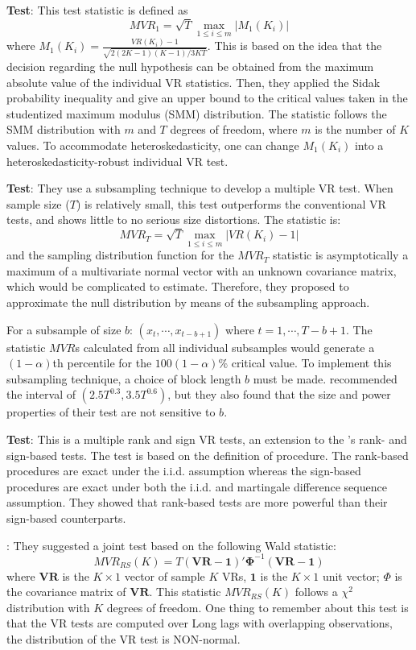 \textbf{\citet{chow1993simple} Test}: This test statistic is defined as 
$$MVR_1=\sqrt{T}\max_{1\leq i \leq m}|M_1(K_i)|$$
where $M_1(K_i) = \frac{VR(K_i)-1}{\sqrt{2(2K-1)(K-1)/3KT}}$. This is based on the idea that the decision regarding the null hypothesis can be obtained from the maximum absolute value of
the individual VR statistics. Then, they applied the Sidak probability inequality and give an upper bound to the critical values taken in the studentized maximum modulus (SMM) distribution.
The statistic follows the SMM distribution with $m$ and $T$ degrees of freedom, where $m$ is the number of $K$ values. To accommodate heteroskedasticity, one can change $M_1(K_i)$ into 
a heteroskedasticity-robust individual VR test.

\textbf{\cite{whang2003multiple} Test}: They use a subsampling technique to develop a multiple VR test. When sample size ($T$) is relatively small, this test outperforms the conventional VR
tests, and shows little to no serious size distortions. The statistic is:
$$
MVR_T = \sqrt{T}\max_{1\leq i \leq m}|VR(K_i)-1|
$$
and the sampling distribution function for the $MVR_T$ statistic is asymptotically a maximum of a multivariate normal vector with an unknown covariance matrix, which would be complicated to
estimate. Therefore, they proposed to approximate the null distribution by means of the subsampling approach.

For a subsample of size $b$: $(x_t,\cdots,x_{t-b+1})$ where $t=1,\cdots,T-b+1$. The statistic $MVR$s calculated from all individual subsamples would generate a $(1-\alpha)$th percentile for the
$100(1-\alpha)\%$ critical value. To implement this subsampling technique, a choice of block length $b$ must be made. \citet{whang2003multiple} recommended the interval of 
$(2.5T^{0.3},3.5T^{0.6})$, but they also found that the size and power properties of their test are not sensitive to $b$.

\textbf{\cite{belaire2004ranks} Test}: This is a multiple rank and sign VR tests, an extension to the \citeauthor{wright2000alternative}'s rank- and sign-based tests. The test is based on 
the definition of \citet{chow1993simple} procedure. The rank-based procedures are exact under the i.i.d. assumption whereas the sign-based procedures are exact under both the i.i.d. and
martingale difference sequence assumption. They showed that rank-based tests are more powerful than their sign-based counterparts.

\textbf{\citet[Wald-Type Test]{richardson1991tests}}: They suggested a joint test based on the following Wald statistic:
$$
MVR_{RS}(K) = T(\mathbf{VR}-\mathbf{1})'\mathbf{\Phi}^{-1}(\mathbf{VR}-\mathbf{1})
$$
where $\mathbf{VR}$ is the $K\times 1$ vector of sample $K$ VRs, $\mathbf{1}$ is the $K\times 1$ unit vector; $\Phi$ is the covariance matrix of $\mathbf{VR}$. This statistic $MVR_{RS}(K)$ follows
a $\chi^2$ distribution with $K$ degrees of freedom. One thing to remember about this test is that the VR tests are computed over Long lags with overlapping observations, the distribution 
of the VR test is NON-normal.

